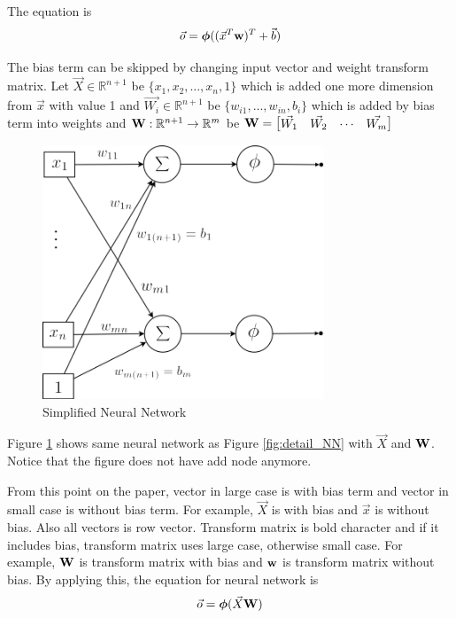 \documentclass[draft,dvipsnames]{drexel-thesis}
\begin{document}
\begin{thesis}
The equation is
$$\vec{o} = \bm{\phi}((\vec{x}^T\bold{w})^T+\vec{b})$$

The bias term can be skipped by changing input vector and weight transform matrix. Let $\vec{X} \in \mathbb{R}^{n+1}$ be $\{x_1, x_2, ..., x_n, 1\}$ which is added one more dimension from $\vec{x}$ with value 1 and $\vec{W_i} \in \mathbb{R}^{n+1}$ be $\{w_{i1}, ..., w_{in}, b_i\}$ which is added by bias term into weights and $\bold{W}: \mathbb{R}^{n+1} \rightarrow \mathbb{R}^m$ be
$\bold{W}=
\begin{bmatrix}
	\vec{W_1} & \vec{W_2} & \cdots & \vec{W_m}
\end{bmatrix}$

\begin{figure}[t!]
    \centering
    \includegraphics[width=0.75\textwidth]{pictures/figures/detail_NN_with_bias.png}
    \caption{Simplified Neural Network}
    \label{fig:withoutBiasNN}
\end{figure}

Figure \ref{fig:withoutBiasNN} shows same neural network as Figure \ref{fig:detail_NN} with $\vec{X}$ and $\bold{W}$. Notice that the figure does not have add node anymore.

	From this point on the paper, vector in large case is with bias term and vector in small case is without bias term. For example, $\vec{X}$ is with bias and $\vec{x}$ is without bias. Also all vectors is row vector. Transform matrix is bold character and if it includes bias, transform matrix uses large case, otherwise small case. For example, $\bold{W}$ is transform matrix with bias and $\bold{w}$ is transform matrix without bias. By applying this, the equation for neural network is
$$\vec{o} = \bm{\phi}(\vec{X}\bold{W})$$
	

\end{thesis}
\end{document}
